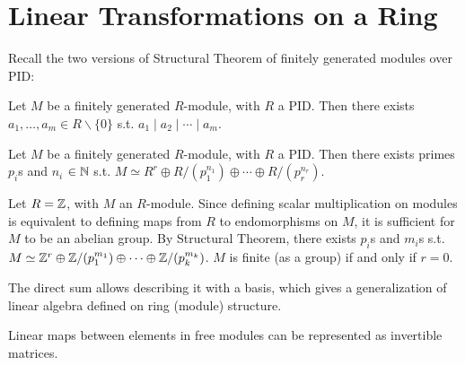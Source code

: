 \section{Linear Transformations on a Ring}

Recall the two versions of Structural Theorem of finitely generated modules over PID:

\begin{theorem}[Sturcture, v1]\label{thm:Structure f.g. modules over PID v1}
    Let $M$ be a finitely generated $R$-module, with $R$ a PID. Then there exists $a_1, \ldots, a_m \in R\smallsetminus\{0\}$ s.t. $a_1 \mid a_2 \mid \cdots \mid a_m$. 
\end{theorem}

\begin{theorem}[Structure, v2]\label{thm:Structure f.g. modules over PID v2}
    Let $M$ be a finitely generated $R$-module, with $R$ a PID. Then there exists primes $p_i$s and $n_i$ $\in \mathbb{N}$ s.t. $M \simeq R^r \oplus R/(p_1^{n_1}) \oplus \cdots \oplus R/(p_r^{n_r})$.
\end{theorem}

\begin{example}
    Let $R = \mathbb{Z}$, with $M$ an $R$-module. Since defining scalar multiplication on modules is equivalent to defining maps from $R$ to endomorphisms on $M$, it is sufficient for $M$ to be an abelian group. By Structural Theorem, there exists $p_i$s and $m_i$s s.t. $M \simeq \mathbb{Z}^r \oplus \mathbb{Z}/(p_1^{m_1}) \oplus \cdots \oplus \mathbb{Z}/(p_k^{m_k})$. $M$ is finite (as a group) if and only if $r = 0$.    
\end{example}

The direct sum allows describing it with a basis, which gives a generalization of linear algebra defined on ring (module) structure. 

\begin{parenthesis}
    Linear maps between elements in free modules can be represented as invertible matrices. 
\end{parenthesis}

